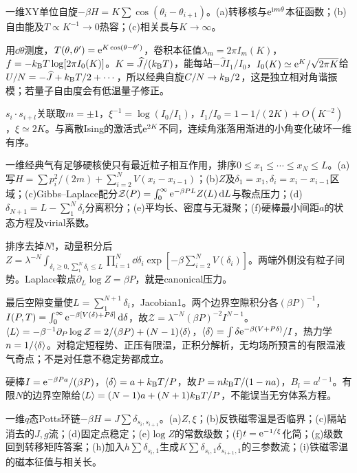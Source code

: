 \begin{exercise}[原题3(a)--(c)]\label{p:334-4-3}
一维XY单位自旋$-\beta H=K\sum\cos(\theta_i-\theta_{i+1})$。(a)转移核与$\mathrm e^{\mathrm i m\theta}$本征函数；(b)自由能及$T\propto K^{-1}\to0$热容；(c)相关長与$K\to\infty$。
\end{exercise}
\begin{solution}
用$\dd\theta$测度，$T(\theta,\theta')=\mathrm e^{K\cos(\theta-\theta')}$，卷积本征值$\lambda_m=2\pi I_m(K)$，$f=-k_{\mathrm B} T\log[2\pi I_0(K)]$。$K=\widehat J/(k_{\mathrm B} T)$，能每站$-\widehat J I_1/I_0$，$I_0(K)\simeq\mathrm e^K/\sqrt{2\pi K}$给$U/N=-\widehat J+k_{\mathrm B} T/2+\cdots$，所以经典自旋$C/N\to k_{\mathrm B}/2$，这是独立相对角谐振模；若量子自由度会有低温量子修正。

$s_i\cdot s_{i+l}$关联取$m=\pm1$，$\xi^{-1}=\log(I_0/I_1)$，$I_1/I_0=1-1/(2K)+O(K^{-2})$，$\xi\simeq2K$。与离散Ising的激活式$\mathrm e^{2K}$不同，连续角涨落用渐进的小角变化破坏一维有序。
\end{solution}
\begin{exercise}[原题4(a)--(f)，选做]\label{p:334-4-4}
一维经典气有足够硬核使只有最近粒子相互作用，排序$0\le x_1\le\cdots\le x_N\le L$。(a)写$H=\sum p_i^2/(2m)+\sum_{i=2}^NV(x_i-x_{i-1})$；(b)$Z$及$\delta_1=x_1,\delta_i=x_i-x_{i-1}$区域；(c)Gibbs--Laplace配分$\mathcal Z(P)=\int_0^\infty\mathrm e^{-\beta PL}Z(L)\,\mathrm d L$与鞍点压力；(d)$\delta_{N+1}=L-\sum_1^N\delta_i$分离积分；(e)平均长、密度与无凝聚；(f)硬棒最小间距$a$的状态方程及virial系数。
\end{exercise}
\begin{solution}
排序去掉$N!$，动量积分后$Z=\lambda^{-N}\int_{\delta_i\ge0,\sum_1^N\delta_i\le L}\prod_{i=1}^N\dd\delta_i\exp[-\beta\sum_{i=2}^NV(\delta_i)]$。两端外侧没有粒子间势。Laplace鞍点$\partial_L\log Z=\beta P$，就是canonical压力。

最后空隙变量使$L=\sum_1^{N+1}\delta_i$，Jacobian1。两个边界空隙积分各$(\beta P)^{-1}$，$I(P,T)=\int_0^\infty\mathrm e^{-\beta[V(\delta)+P\delta]}\,\mathrm d\delta$，故$\mathcal Z=\lambda^{-N}(\beta P)^{-2}I^{N-1}$。$\langle L\rangle=-\beta^{-1}\partial_P\log\mathcal Z=2/(\beta P)+(N-1)\langle \delta\rangle$，$\langle \delta\rangle=\int\delta\mathrm e^{-\beta(V+P\delta)}/I$，热力学$n=1/\langle \delta\rangle$。对稳定短程势、正压有限温，正积分解析，无均场所预言的有限温液气奇点；不是对任意不稳定势都成立。

硬棒$I=\mathrm e^{-\beta Pa}/(\beta P)$，$\langle \delta\rangle=a+k_{\mathrm B} T/P$，故$P=nk_{\mathrm B} T/(1-na)$，$B_l=a^{l-1}$。有限$N$的边界空隙给$\langle L\rangle=(N-1)a+(N+1)k_{\mathrm B} T/P$，不能误当无穷体系方程。
\end{solution}
\begin{exercise}[原题5(a)--(i)]\label{p:334-4-5}
一维$q$态Potts环链$-\beta H=J\sum\delta_{s_i,s_{i+1}}$。(a)$Z,\xi$；(b)反铁磁零温是否临界；(c)隔站消去的$J,g$流；(d)固定点稳定；(e)$\log Z$的常数级数；(f)$t=\mathrm e^{-1/\xi}$化简；(g)级数回到转移矩阵答案；(h)加入$h\sum\delta_{s_i,1}$生成$K\sum\delta_{s_i,1}\delta_{s_{i+1},1}$的三参数流；(i)铁磁零温的磁本征值与相关长。
\end{exercise}
